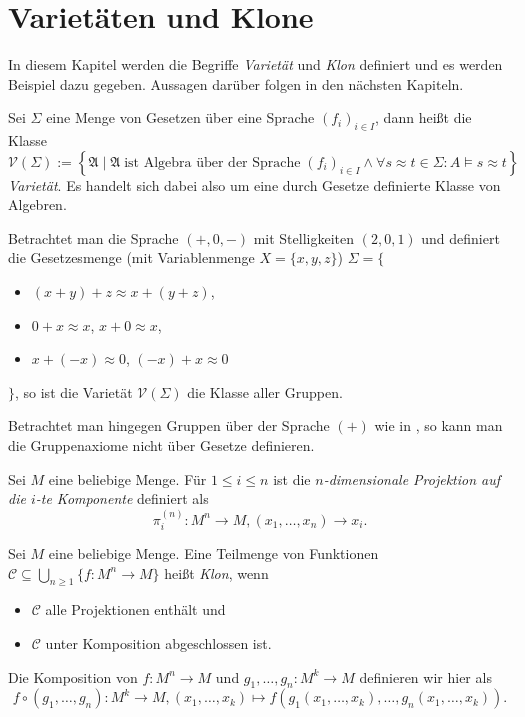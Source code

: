 \section{Varietäten und Klone}
In diesem Kapitel werden die Begriffe \emph{Varietät} und \emph{Klon} definiert und es werden Beispiel dazu gegeben. Aussagen darüber folgen in den nächsten Kapiteln.

\begin{definition}
    Sei $\Sigma$ eine Menge von Gesetzen über eine Sprache $(f_i)_{i \in I}$, dann heißt die Klasse
    $$ \mathcal{V}(\Sigma) := \left\{ \mathfrak{A} \mid \mathfrak{A} \;\text{ist Algebra über der Sprache}\; (f_i)_{i \in I} \land \forall s \approx t \in \Sigma: A\models s\approx t \right\} $$
    \emph{Varietät}. Es handelt sich dabei also um eine durch Gesetze definierte Klasse von Algebren.
\end{definition}

\begin{example}
    Betrachtet man die Sprache $(+, 0, -)$ mit Stelligkeiten $(2, 0, 1)$ und definiert die Gesetzesmenge (mit Variablenmenge $X = \{x,y,z\}$) $\Sigma = \{$
    \begin{itemize}[label={}]
        \item $(x + y) + z \approx x + (y + z)$,
        \item $0 + x \approx x$, $x + 0 \approx x$,
        \item $x + (-x) \approx 0$, $(-x) + x \approx 0$
    \end{itemize}
    $\}$, so ist die Varietät $\mathcal{V}(\Sigma)$ die Klasse aller Gruppen.
    
    Betrachtet man hingegen Gruppen über der Sprache $(+)$ wie in , so kann man die Gruppenaxiome nicht über Gesetze definieren.
\end{example}

\begin{definition}
    Sei $M$ eine beliebige Menge. Für $1 \le i \le n$ ist die \emph{$n$-dimensionale Projektion auf die $i$-te Komponente} definiert als
    $$ \pi_i^{(n)}: M^n \to M, (x_1, \ldots, x_n) \to x_i. $$
\end{definition}

\begin{definition}
    Sei $M$ eine beliebige Menge. Eine Teilmenge von Funktionen $\mathcal{C} \subseteq \bigcup_{n \ge 1} \{f: M^n \to M\}$ heißt \emph{Klon}, wenn 
    \begin{itemize}
        \item $\mathcal{C}$ alle Projektionen enthält und
        \item $\mathcal{C}$ unter Komposition abgeschlossen ist.
    \end{itemize}

    Die Komposition von $f: M^n \to M$ und $g_1, \ldots, g_n: M^k \to M$ definieren wir hier als 
    $$ f \circ (g_1, \ldots, g_n): M^k \to M, (x_1, \ldots, x_k) \mapsto f(g_1(x_1, \ldots, x_k), \ldots, g_n(x_1, \ldots, x_k)).$$
\end{definition}

